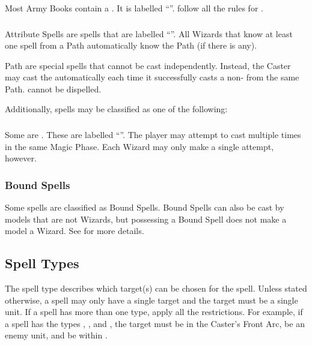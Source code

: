 Most Army Books contain a \hereditaryspell{}. It is labelled \enquote{\textbf{\hereditaryspellnumber}}. \hereditaryspells{} follow all the rules for \learnedspells{}.

\subsubsection{\attributespells}
\label{attribute_spells}

Attribute Spells are spells that are labelled \enquote{\textbf{\attributespellnumber}}. All Wizards that know at least one spell from a Path automatically know the Path \attributespell{} (if there is any).

Path \attributespells{} are special spells that cannot be cast independently. Instead, the Caster may cast the \attributespell{} automatically each time it successfully casts a non-\attributespell{} from the same Path. \attributespells{} cannot be dispelled.

Additionally, spells may be classified as one of the following:

\subsubsection{\replicablespells}
\label{replicable_spells}

Some \learnedspells{} are \replicablespells{}. These are labelled \enquote{\textit{\textbf{\replicablespellnumber}}}. The player may attempt to cast \replicablespells{} multiple times in the same Magic Phase. Each Wizard may only make a single attempt, however.

\subsubsection{Bound Spells}
\label{bound_spells_classification}

Some spells are classified as Bound Spells. Bound Spells can also be cast by models that are not Wizards, but possessing a Bound Spell does not make a model a Wizard. See  for more details.

\subsection{Spell Types}
\label{spell_types}

The spell type describes which target(s) can be chosen for the spell. Unless stated otherwise, a spell may only have a single target and the target must be a single unit. If a spell has more than one type, apply all the restrictions. For example, if a spell has the types \direct{}, \hex{}, and , the target must be in the Caster's Front Arc, be an enemy unit, and be within .

